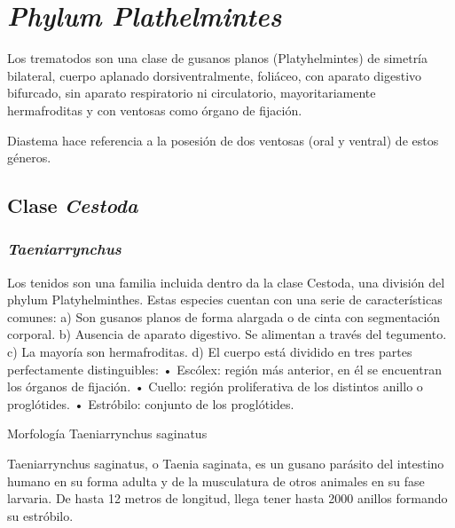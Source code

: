 \chapter{\textit{Phylum Plathelmintes}}

Los trematodos son una clase de gusanos planos (Platyhelmintes) de simetría bilateral, cuerpo aplanado dorsiventralmente, foliáceo, con aparato digestivo bifurcado, sin aparato respiratorio ni circulatorio, mayoritariamente hermafroditas y con ventosas como órgano de fijación.

Diastema hace referencia a la posesión de dos ventosas (oral y ventral) de estos géneros.
\newpage
\section{Clase \textit{Cestoda}}
\subsection{\textit{Taeniarrynchus}}
Los tenidos son una familia incluida dentro da la clase Cestoda, una división del phylum Platyhelminthes. Estas especies cuentan con una serie de características comunes:
a) Son gusanos planos de forma alargada o de cinta con segmentación corporal.
b) Ausencia de aparato digestivo. Se alimentan a través del tegumento.
c) La mayoría son hermafroditas.
d) El cuerpo está dividido en tres partes perfectamente distinguibles:
• Escólex: región más anterior, en él se encuentran los órganos de fijación.
• Cuello: región proliferativa de los distintos anillo o proglótides.
• Estróbilo: conjunto de los proglótides.

Morfología
Taeniarrynchus saginatus

Taeniarrynchus saginatus, o Taenia saginata, es un gusano parásito del intestino humano en su forma adulta y de la musculatura de otros animales en su fase larvaria. De hasta 12 metros de longitud, llega tener hasta 2000 anillos formando su estróbilo. 

